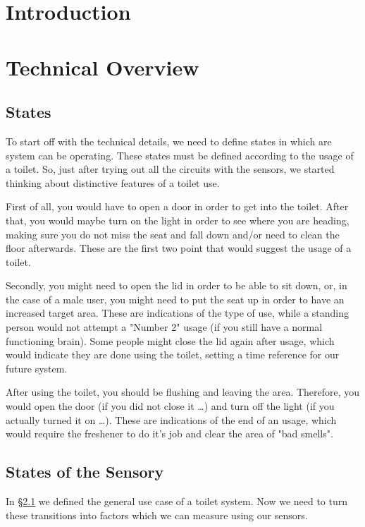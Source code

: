 \documentclass[a4paper, 11pt]{article}
\begin{document}
\maketitle

\section{Introduction}


\section{Technical Overview}


\subsection{States}
\label{sub:state}
To start off with the technical details, we need to define states in which are system can be operating. These states must be defined according to the usage of a toilet. So, just after trying out all the circuits with the sensors, we started thinking about distinctive features of a toilet use. 

First of all, you would have to open a door in order to get into the toilet. After that, you would maybe turn on the light in order to see where you are heading, making sure you do not miss the seat and fall down and/or need to clean the floor afterwards. These are the first two point that would suggest the usage of a toilet.

Secondly, you might need to open the lid in order to be able to sit down, or, in the case of a male user, you might need to put the seat up in order to have an increased target area. These are indications of the type of use, while a standing person would not attempt a "Number 2" usage (if you still have a normal functioning brain). Some people might close the lid again after usage, which would indicate they are done using the toilet, setting a time reference for our future system.

After using the toilet, you should be flushing and leaving the area. Therefore, you would open the door (if you did not close it \ldots) and turn off the light (if you actually turned it on \ldots). These are indications of the end of an usage, which would require the freshener to do it's job and clear the area of "bad smells".

\subsection{States of the Sensory}
In \S\hyperref[sub:state]{\ref{sub:state}} we defined the general use case of a toilet system. Now we need to turn these transitions into factors which we can measure using our sensors. 
\end{document}

